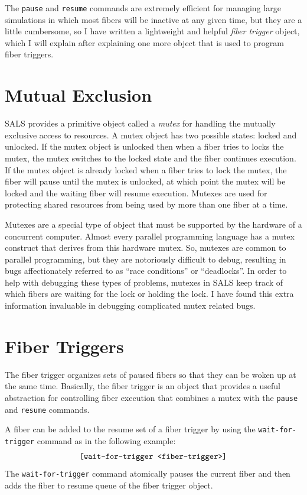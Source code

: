 The {\tt pause} and {\tt resume} commands are extremely efficient for
managing large simulations in which most fibers will be inactive at
any given time, but they are a little cumbersome, so I have written a
lightweight and helpful \emph{fiber trigger} object, which I will
explain after explaining one more object that is used to program fiber
triggers.

\section{Mutual Exclusion}

SALS provides a primitive object called a \emph{mutex} for handling
the mutually exclusive access to resources.  A mutex object has two
possible states: locked and unlocked.  If the mutex object is unlocked
then when a fiber tries to locks the mutex, the mutex switches to the
locked state and the fiber continues execution.  If the mutex object
is already locked when a fiber tries to lock the mutex, the fiber will
pause until the mutex is unlocked, at which point the mutex will be
locked and the waiting fiber will resume execution.  Mutexes are used
for protecting shared resources from being used by more than one fiber
at a time.

Mutexes are a special type of object that must be supported by the
hardware of a concurrent computer.  Almost every parallel programming
language has a mutex construct that derives from this hardware mutex.
So, mutexes are common to parallel programming, but they are
notoriously difficult to debug, resulting in bugs affectionately
referred to as ``race conditions'' or ``deadlocks''.  In order to help
with debugging these types of problems, mutexes in SALS keep track of
which fibers are waiting for the lock or holding the lock.  I have
found this extra information invaluable in debugging complicated mutex
related bugs.

\section{Fiber Triggers}

The fiber trigger organizes sets of paused fibers so that they can be
woken up at the same time.  Basically, the fiber trigger is an object
that provides a useful abstraction for controlling fiber execution
that combines a mutex with the {\tt pause} and {\tt resume} commands.

A fiber can be added to the resume set of a fiber trigger by using the
{\tt wait-for-trigger} command as in the following example:
\begin{equation*}
\text{\tt [wait-for-trigger <fiber-trigger>]}
\end{equation*}
The {\tt wait-for-trigger} command atomically pauses the current fiber
and then adds the fiber to resume queue of the fiber trigger object.

